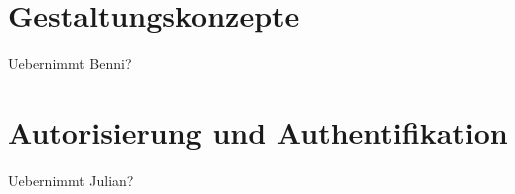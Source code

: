 \section{Gestaltungskonzepte}
\begin{k}
Uebernimmt Benni?
\end{k}

\section{Autorisierung und Authentifikation}
\begin{k}
Uebernimmt Julian?
\end{k}